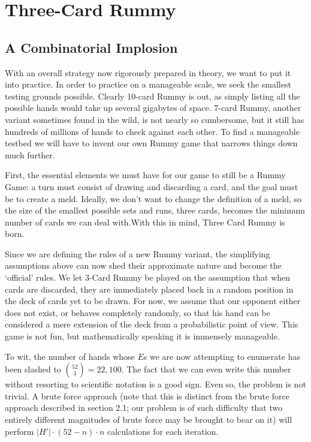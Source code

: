 \documentclass[letter,12pt]{article}
\begin{document}
\section{Three-Card Rummy}

\subsection{A Combinatorial Implosion}

With an overall strategy now rigorously prepared in theory, we want to put it into practice. In order to practice on a manageable scale, we seek the smallest testing grounds possible. Clearly 10-card Rummy is out, as simply listing all the possible hands would take up several gigabytes of space. 7-card Rummy, another variant sometimes found in the wild, is not nearly so cumbersome, but it still has hundreds of millions of hands to check against each other. To find a manageable testbed we will have to invent our own Rummy game that narrows things down much further.

First, the essential elements we must have for our game to still be a Rummy Game: a turn must consist of drawing and discarding a card, and the goal must be to create a meld. Ideally, we don’t want to change the definition of a meld, so the size of the smallest possible sets and runs, three cards, becomes the minimum number of cards we can deal with.With this in mind, Three Card Rummy is born. 

Since we are defining the rules of a new Rummy variant, the simplifying assumptions above can now shed their approximate nature and become the ‘official’ rules. We let 3-Card Rummy be played on the assumption that when cards are discarded, they are immediately placed back in a random position in the deck of cards yet to be drawn. For now, we assume that our opponent either does not exist, or behaves completely randomly, so that his hand can be considered a mere extension of the deck from a probabilistic point of view. This game is not fun, but mathematically speaking it is immensely manageable. 

To wit, the number of hands whose $E$s we are now attempting to enumerate has been slashed to $\binom{52}{3} = 22,100$. The fact that we can even write this number without resorting to scientific notation is a good sign. Even so, the problem is not trivial. A brute force approach (note that this is distinct from the brute force approach described in section 2.1; our problem is of such difficulty that two entirely different magnitudes of brute force may be brought to bear on it) will perform $|H′| \cdot(52−n ) \cdot n$ calculations for each iteration.
\end{document}

